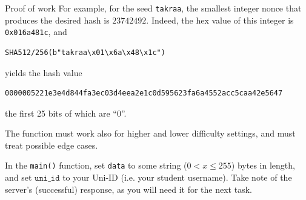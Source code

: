 \documentclass{homework}
\begin{document}
\begin{task}{Proof of work}
  For example, for the seed \texttt{takraa}, the smallest integer nonce that produces the desired hash is $23742492$.
  Indeed, the hex value of this integer is \texttt{0x016a481c}, and
   \begin{Verbatim}
SHA512/256(b"takraa\x01\x6a\x48\x1c")
  \end{Verbatim}
  yields the hash value
  \begin{Verbatim}
0000005221e3e4d844fa3ec03d4eea2e1c0d595623fa6a4552acc5caa42e5647
  \end{Verbatim}
  the first 25 bits of which are \enquote{0}.

  The function must work also for higher and lower difficulty settings, and must treat possible edge cases.

  In the \texttt{main()} function, set \texttt{data} to some string ($0<x\le255$) bytes in length, and set $\texttt{uni\_id}$ to your Uni-ID (i.e. your student username).
  Take note of the server's (successful) response, as you will need it for the next task.
\end{task}

\newpage
\end{document}
